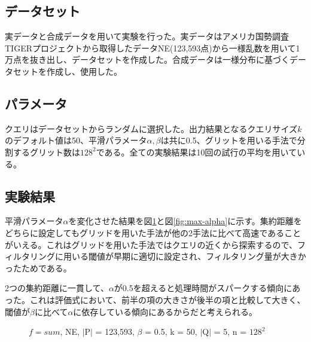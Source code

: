 \documentclass{deimj}
\begin{document}
\subsection{データセット}
実データと合成データを用いて実験を行った。実データはアメリカ国勢調査TIGERプロジェクト\cite{chorochronos}から取得したデータNE(123,593点)から一様乱数を用いて1万点を抜き出し、データセットを作成した。合成データは一様分布に基づくデータセットを作成し、使用した。

\subsection{パラメータ}
クエリはデータセットからランダムに選択した。出力結果となるクエリサイズ$k$のデフォルト値は50、平滑パラメータ$\alpha, \beta$は共に0.5、グリットを用いる手法で分割するグリット数は$128^2$である。全ての実験結果は10回の試行の平均を用いている。

\subsection{実験結果}
平滑パラメータ$\alpha$を変化させた結果を図\ref{fig:sum-alpha}と図\ref{fig:max-alpha}に示す。集約距離をどちらに設定してもグリッドを用いた手法が他の2手法に比べて高速であることがいえる。これはグリッドを用いた手法ではクエリの近くから探索するので、フィルタリングに用いる閾値が早期に適切に設定され、フィルタリング量が大きかったためである。


2つの集約距離に一貫して、$\alpha$が0.5を超えると処理時間がスパークする傾向にあった。これは評価式において、前半の項の大きさが後半の項と比較して大きく、閾値が$\beta$に比べて$\alpha$に依存している傾向にあるからだと考えられる。

\begin{figure}[H]
	\centering
    \caption{$f=sum$, NE, $\mid$P$\mid$ = 123,593, $\beta$ = 0.5, k = 50, $\mid$Q$\mid$ = 5, n = $128^2$}
    \label{fig:sum-alpha}
\end{figure}
\end{document}
